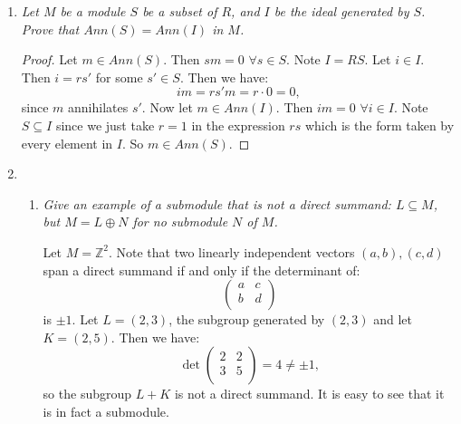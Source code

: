 \documentclass[9pt,reqno,twoside]{amsbook}
\theoremstyle{plain}
\numberwithin{section}{chapter}
\numberwithin{equation}{chapter}
\theoremstyle{definition}
\theoremstyle{remark}
\theoremstyle{plain}
\newcommand{\sub}{\subseteq}
\newcommand{\z}{\mathbb{Z}}
\newcommand{\bb}{\vspace{3mm}}
\begin{document}
\begin{enumerate}[label=\arabic*.]
\begin{proof}
Let $I = (a_1),J = (a_2)$. Then since we are in a PID, we know $Ann(a_1) = Ann(I)$ and the same for $J$. Then note that $I,J$ are comaximal since $a_1,a_2$ are relatively prime, and we are in a PID, thus $I + J = (1) = R$. Also note that $Ann(a_1a_2) = Ann(I \cap J)$ since $(a_1a_2) = (a_1) \cap (a_2)$.  Let $m \in Ann(I + J) = Ann((1)) = Ann(R)$ since $I,J$ are comaximal, and $R$ is commutative and unital. So $rm = 0$ for all $r \in R$. So then $m \in Ann(I)$, and since $0 \in Ann(J)$, we may write $m = m + 0$, so $m \in Ann(I) + Ann(J)$. And thus $Ann(I + J) \sub Ann(I) + Ann(J)$. The other inclusion is trivial. So we have that $Ann(a_1a_2) = Ann(a_1) + Ann(a_2)$. By Theorem \ref{thm10.67}, we have have that their intersection is trivial since if $m \neq 0$ and $a_1m = 0$ and $a_2m = 0$. Since $a_1,a_2$ are coprime we have $r,s \in R$ s.t. $ra_1 + sa_2 = 1$. So we also have $ra_1m = 0$ and $sa_2m = 0$.  So then we have:
$$
(ra_1 + sa_2)m = 1m = m = 0.
$$
So $Ann(a_1) \cap Ann(a_2) = 0$. So by Theorem \ref{thm10.67} we know $Ann(a_1a_2) = Ann(a_1) \oplus Ann(a_2)$. 
\end{proof}

\item \textit{Let $M$ be a module $S$ be a subset of $R$, and $I$ be the ideal generated by $S$. Prove that $Ann(S) = Ann(I)$ in $M$. }

\begin{proof}
Let $m \in Ann(S)$. Then $sm = 0$ $\forall s \in S$. Note $I = RS$. Let $i \in I$. Then $i = rs'$ for some $s' \in S$. Then we have: 
$$
im = rs'm = r\cdot 0 = 0,
$$
 since $m$ annihilates $s'$. Now let $m \in Ann(I)$. Then $im = 0$ $\forall i \in I$. Note $S \sub I$ since we just take $r = 1$ in the expression $rs$ which is the form taken by every element in $I$. So $m \in Ann(S)$. 
\end{proof}

\item 
\begin{enumerate}
\item 
\textit{Give an example of a submodule that is not a direct summand: $L \sub M$, but $M = L \oplus N$ for no submodule $N$ of $M$. }

Let $M = \z^2$. Note that two linearly independent vectors $(a,b),(c,d)$ span a direct summand if and only if the determinant of:
$$\left(
\begin{matrix}
a & c\\
b & d\\
\end{matrix}
\right)
$$
is $\pm 1$. Let $L = (2,3)$, the subgroup generated by $(2,3)$ and let $K = (2,5)$. Then we have:
$$
\det\left(
\begin{matrix}
2 & 2\\
3 & 5\\
\end{matrix}
\right) = 4 \neq \pm 1,
$$
so the subgroup $L + K$ is not a direct summand. It is easy to see that it is in fact a submodule. \bb


\end{enumerate}
\end{enumerate}
\end{document}
